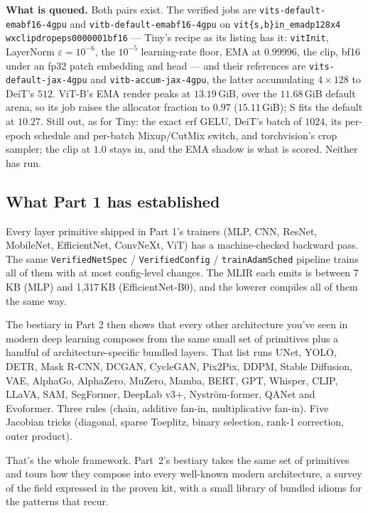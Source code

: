 \medskip\noindent\textbf{What is queued.} Both pairs exist. The verified jobs
are \texttt{vits-default-emabf16-4gpu} and \texttt{vitb-default-emabf16-4gpu}
on \texttt{vit\{s,b\}in\_\allowbreak emadp128x4\allowbreak
wxclipdropeps0000001bf16} --- Tiny's recipe as its listing has it:
\texttt{vitInit}, LayerNorm $\varepsilon = 10^{-6}$, the $10^{-5}$
learning-rate floor, EMA at $0.99996$, the clip, bf16 under an fp32 patch
embedding and head --- and their references are
\texttt{vits-default-jax-4gpu} and \texttt{vitb-accum-jax-4gpu}, the latter
accumulating $4\times128$ to DeiT's $512$. ViT-B's EMA render peaks at
$13.19$\,GiB, over the $11.68$\,GiB default arena, so its job raises the
allocator fraction to $0.97$ ($15.11$\,GiB); S fits the default at $10.27$.
Still out, as for Tiny: the exact erf GELU, DeiT's batch of $1024$, its
per-epoch schedule and per-batch Mixup/CutMix switch, and torchvision's
crop sampler; the clip at $1.0$ stays in, and the EMA shadow is what is
scored. Neither has run.

\subsection*{What Part 1 has established}

Every layer primitive shipped in Part 1's trainers (MLP,
CNN, ResNet, MobileNet, EfficientNet, ConvNeXt, ViT) has a
machine-checked backward pass. The same \texttt{VerifiedNetSpec} /
\texttt{VerifiedConfig} / \texttt{trainAdamSched} pipeline trains all
of them with at most config-level changes. The MLIR each emits is
between 7\,KB (MLP) and 1{,}317\,KB (EfficientNet-B0), and the
lowerer compiles all of them the same way.

The bestiary in Part 2 then shows that every other
architecture you've seen in modern deep learning composes from the
same small set of primitives plus a handful of
architecture-specific bundled layers. That list runs UNet, YOLO, DETR,
Mask R-CNN, DCGAN, CycleGAN, Pix2Pix, DDPM, Stable Diffusion, VAE,
AlphaGo, AlphaZero, MuZero, Mamba, BERT, GPT, Whisper, CLIP, LLaVA,
SAM, SegFormer, DeepLab v3+, Nyström-former, QANet and Evoformer. Three rules (chain, additive
fan-in, multiplicative fan-in). Five Jacobian tricks (diagonal,
sparse Toeplitz, binary selection, rank-1 correction, outer
product).

That's the whole framework. Part~2's bestiary takes the same set
of primitives and tours how they compose into every well-known
modern architecture, a survey of the field expressed in the
proven kit, with a small library of bundled idioms for the patterns
that recur.

